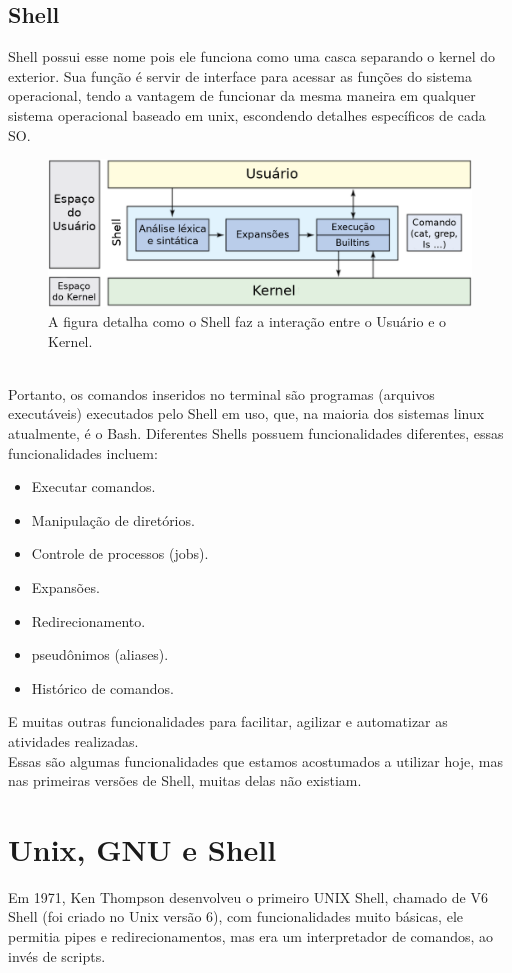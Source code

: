 \documentclass[oneside, 11 pt]{article}
\begin{document}
	\subsection{Shell}
	Shell possui esse nome pois ele funciona como uma casca separando o kernel do exterior. Sua função é servir de interface para acessar as funções do sistema operacional, tendo a vantagem de funcionar da mesma maneira em qualquer sistema operacional baseado em unix, escondendo detalhes específicos de cada SO.
	\begin{figure}[h]
		\includegraphics[width=\linewidth]{shell_struct1.png}
		\caption{A figura detalha como o Shell faz a interação entre o Usuário e o Kernel.}
		\label{fig:shellstruct}
	\end{figure}\\
	Portanto, os comandos inseridos no terminal são programas (arquivos executáveis) executados pelo Shell em uso, que, na maioria dos sistemas linux atualmente, é o Bash. Diferentes Shells possuem funcionalidades diferentes, essas funcionalidades incluem:
	\begin{itemize}
		\item Executar comandos.
		\item Manipulação de diretórios.
		\item Controle de processos (jobs).
		\item Expansões.
		\item Redirecionamento.
		\item pseudônimos (aliases).
		\item Histórico de comandos.
	\end{itemize}
	E muitas outras funcionalidades para facilitar, agilizar e automatizar as atividades realizadas.\\
	Essas são algumas funcionalidades que estamos acostumados a utilizar hoje, mas nas primeiras versões de Shell, muitas delas não existiam.
	
	\section{Unix, GNU e Shell}
	Em 1971, Ken Thompson desenvolveu o primeiro UNIX Shell, chamado de V6 Shell (foi criado no Unix versão 6), com funcionalidades muito básicas, ele permitia pipes e redirecionamentos, mas era um interpretador de comandos, ao invés de scripts.
	
\end{document}
